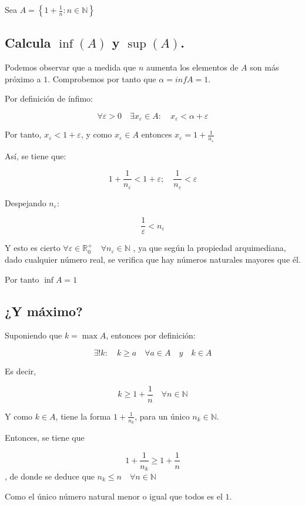 \documentclass[11pt]{article}
\begin{document}
Sea $A = \left\{ 1 + \frac{1}{n}: n \in \mathbb{N} \right\}$

\subsection{Calcula $\inf(A)$ y $\sup(A)$.}
\label{sec-5-2}

Podemos observar que a medida que $n$ aumenta los elementos
de $A$ son más próximo a $1$. Comprobemos por tanto que
$\alpha = inf A = 1$. 

Por definición de ínfimo:

\[
\forall \varepsilon > 0 \quad \exists x_\varepsilon \in A: \quad  x_\varepsilon < \alpha + \varepsilon
\]

Por tanto, $x_\varepsilon < 1 + \varepsilon$, y como
$x_\varepsilon \in A$ entonces $x_\varepsilon = 1 + \frac{1}{n_\varepsilon}$

Así, se tiene que:

\[
1 + \frac{1}{n_\varepsilon} < 1 + \varepsilon; \quad 
\frac{1}{n_\varepsilon} < \varepsilon
\]

Despejando $n_\varepsilon$:

\[ \frac{1}{\varepsilon} < n_\varepsilon \]

Y esto es cierto $\forall \varepsilon \in \mathbb{R}_0^+ \quad \forall n_\varepsilon \in \mathbb{N}$ , ya que según la propiedad arquimediana,
dado cualquier número real, se verifica que hay números naturales mayores que él.

Por tanto $\inf A=1$

\subsection{¿Y máximo?}
\label{sec-5-3}

Suponiendo que $k=\max A$, entonces por definición:

\[\exists! k:\quad k \geq a \quad \forall a \in A \quad y \quad k \in A\]

Es decir,

\[ k \geq 1 + \frac{1}{n} \quad \forall n \in \mathbb{N} \]

Y como $k \in A$, tiene la forma $1 + \frac{1}{n_k}$,
para un único $n_k \in \mathbb{N}$.

Entonces, se tiene que

\[ 1 + \frac{1}{n_k} \geq 1 + \frac{1}{n}\], de donde se deduce que \(n_k \leq n \quad \forall n \in \mathbb{N} \)

Como el único número natural menor o igual que todos es el $1$.
\end{document}
